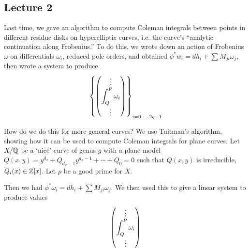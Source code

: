 \newpage
\subsection{Lecture 2}

Last time, we gave an algorithm to compute Coleman integrals between points in different residue disks on hyperelliptic curves, i.e. the  curve's ``analytic continuation along Frobenius.'' To do this, we wrote down an action of Frobenius $\omega$ on differentials $\omega_i$, reduced pole orders, and obtained $\phi^* w_i= dh_i + \sum M_{ji} \omega_j$, then wrote a system to produce 
	\[
	\left\{
	\begin{pmatrix}
	\vdots \\
	\displaystyle \int_Q^P \omega_i \\
	\vdots
	\end{pmatrix} 
	\right\}_{i=0,\ldots,2g-1}
	\]


How do we do this for more general curves? We use Tuitman's algorithm, showing how it can be used to compute Coleman integrals for plane curves. Let $X/\mathbb{Q}$ be a `nice' curve of genus $g$ with a plane model $Q(x,y)= y^{d_x} + Q_{d_x-1} y^{d_x-1} + \cdots + Q_0= 0$ such that $Q(x,y)$ is irreducible, $Q_i(x) \in \mathbb{Z}[x]$. Let $p$ be a good prime for $X$.


\noindent{} \par\vspace{\baselineskip}


Then we had $\phi^*\omega_i= dh_i + \sum M_{ji} \omega_j$. We then used this to give a linear system to produce values
	\[
	\begin{pmatrix}
	\vdots \\
	\displaystyle\int_Q^P \omega_i \\
	\vdots
	\end{pmatrix}
	\]


